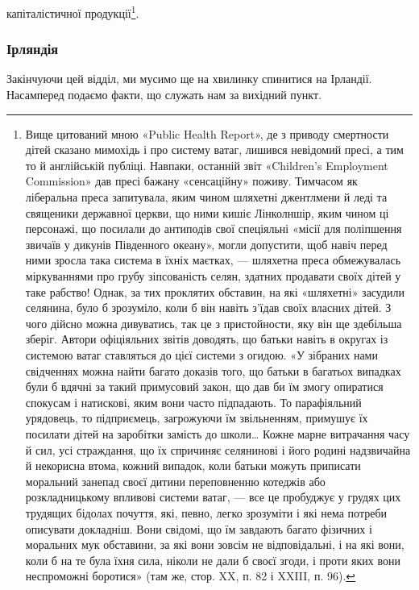 капіталістичної продукції\footnote{
Вище цитований мною «Public Health Report», де з приводу
смертности дітей сказано мимохідь і про систему ватаг, лишився невідомий
пресі, а тим то й англійській публіці. Навпаки, останній звіт «Children’s
Employment Commission» дав пресі бажану «сенсаційну» поживу.
Тимчасом як ліберальна преса запитувала, яким чином шляхетні джентлмени
й леді та священики державної церкви, що ними кишіє Лінколншір,
яким чином ці персонажі, що посилали до антиподів свої спеціяльні
«місії для поліпшення звичаїв у дикунів Південного океану», могли допустити,
щоб навіч перед ними зросла така система в їхніх маєтках, —
шляхетна преса обмежувалась міркуваннями про грубу зіпсованість
селян, здатних продавати своїх дітей у таке рабство! Однак, за тих проклятих
обставин, на які «шляхетні» засудили селянина, було б зрозуміло,
коли б він навіть з’їдав своїх власних дітей. З чого дійсно можна
дивуватись, так це з пристойности, яку він ще здебільша зберіг. Автори
офіціяльних звітів доводять, що батьки навіть в округах із системою ватаг
ставляться до цієї системи з огидою. «У зібраних нами свідченнях можна
найти багато доказів того, що батьки в багатьох випадках були б вдячні
за такий примусовий закон, що дав би їм змогу опиратися спокусам і
натискові, яким вони часто підпадають. То парафіяльний урядовець,
то підприємець, загрожуючи їм звільненням, примушує їх посилати дітей
на заробітки замість до школи\dots{} Кожне марне витрачання часу й сил,
усі страждання, що їх спричиняє селянинові і його родині надзвичайна
й некорисна втома, кожний випадок, коли батьки можуть приписати
моральний занепад своєї дитини переповненню котеджів або розкладницькому
впливові системи ватаг, — все це пробуджує у грудях цих трудящих
бідолах почуття, які, певно, легко зрозуміти і які нема потреби описувати
докладніш. Вони свідомі, що їм завдають багато фізичних і моральних
мук обставини, за які вони зовсім не відповідальні, і на які вони,
коли б на те була їхня сила, ніколи не дали б своєї згоди, і проти яких
вони неспроможні боротися» (там же, стор. XX, п. 82 і XXIII, п. 96).
}.

\manualpagebreak{}
\subsubsection{Ірляндія}

Закінчуючи цей відділ, ми мусимо ще на хвилинку спинитися
на Ірландії. Насамперед подаємо факти, що служать нам
за вихідний пункт.
